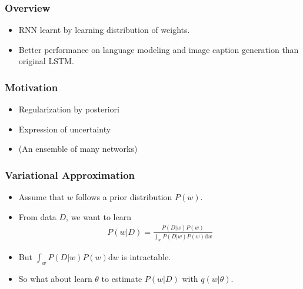 \begin{frame}
  \frametitle{Overview}
  \begin{itemize}
  \item RNN learnt by learning distribution of weights.
  \item Better performance on language modeling and image caption generation than original LSTM.
  \end{itemize}
\end{frame}


\begin{frame}
  \frametitle{Motivation}
  \begin{itemize}
  \item Regularization by posteriori
  \item Expression of uncertainty
  \item (An ensemble of many networks)
  \end{itemize}
\end{frame}


\begin{frame}
  \frametitle{Variational Approximation}
  \begin{itemize}
  \item Assume that $w$ follows a prior distribution $P(w)$.
  \item From data $D$, we want to learn 
    \begin{align*}
      P(w | D) = \frac{P(D | w) P(w)}{\int_w P(D | w) P(w) \mathrm{d}w }
    \end{align*}
  \item But $\int_w P(D | w) P(w) \mathrm{d}w$ is intractable.
  \item So what about learn $\theta$ to estimate $P(w | D)$ with $q(w | \theta)$.
  \end{itemize}
\end{frame}


